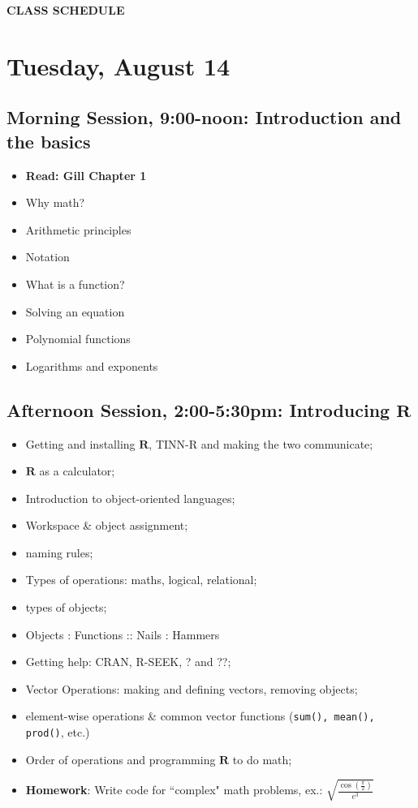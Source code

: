 \documentclass[12pt,a4paper]{article}
\begin{document}


\clearpage
\textbf{CLASS SCHEDULE}\\

\section*{Tuesday, August 14}
\subsection*{Morning Session, 9:00-noon: Introduction and the basics}
\begin{itemize}
\setlength{\itemsep}{0pt}
\footnotesize
\item \textbf{Read: Gill Chapter 1}
\item Why math?
\item Arithmetic principles
\item Notation
\item What is a function?
\item Solving an equation
\item Polynomial functions
\item Logarithms and exponents
\end{itemize}

\subsection*{Afternoon Session, 2:00-5:30pm: Introducing $\mathbf{R}$}
\begin{itemize}
\setlength{\itemsep}{0pt}
\footnotesize
\item Getting and installing $\mathbf{R}$, TINN-R and making the two communicate;
\item $\mathbf{R}$ as a calculator;
\item Introduction to object-oriented languages;
\item Workspace \& object assignment;
\item naming rules;
\item Types of operations: maths, logical, relational;
\item types of objects;
\item Objects : Functions :: Nails : Hammers
\item Getting help: CRAN, R-SEEK, ? and ??;
\item Vector Operations: making and defining vectors, removing objects;
\item element-wise operations \& common vector functions (\texttt{sum(), mean(), prod()}, etc.)
\item Order of operations and programming $\mathbf{R}$ to do math;
\item \textbf{Homework}: Write code for ``complex" math problems, ex.: $\sqrt{\frac{\cos(\frac{\pi}{2})}{e^{3}}}$
\end{itemize}
\end{document}
